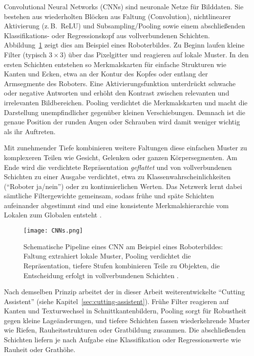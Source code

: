 Convolutional Neural Networks (CNNs) sind neuronale Netze für Bilddaten. Sie bestehen aus wiederholten Blöcken aus Faltung (Convolution), nichtlinearer Aktivierung (z.\,B.\ ReLU) und Subsampling/Pooling sowie einem abschließenden Klassifikations- oder Regressionskopf aus vollverbundenen Schichten. Abbildung~\ref{fig:cnn-schema} zeigt dies am Beispiel eines Roboterbildes. Zu Beginn laufen kleine Filter (typisch $3{\times}3$) über das Pixelgitter und reagieren auf lokale Muster. In den ersten Schichten entstehen so Merkmalskarten für einfache Strukturen wie Kanten und Ecken, etwa an der Kontur des Kopfes oder entlang der Armsegmente des Roboters. Eine Aktivierungsfunktion unterdrückt schwache oder negative Antworten und erhöht den Kontrast zwischen relevanten und irrelevanten Bildbereichen. Pooling verdichtet die Merkmalskarten und macht die Darstellung unempfindlicher gegenüber kleinen Verschiebungen. Demnach ist die genaue Position der runden Augen oder Schrauben wird damit weniger wichtig als ihr Auftreten.

Mit zunehmender Tiefe kombinieren weitere Faltungen diese einfachen Muster zu komplexeren Teilen wie Gesicht, Gelenken oder ganzen Körpersegmenten. Am Ende wird die verdichtete Repräsentation \emph{geflattet} und von vollverbundenen Schichten zu einer Ausgabe verdichtet, etwa zu Klassenwahrscheinlichkeiten (\enquote{Roboter ja/nein}) oder zu kontinuierlichen Werten. Das Netzwerk lernt dabei sämtliche Filtergewichte gemeinsam, sodass frühe und späte Schichten aufeinander abgestimmt sind und eine konsistente Merkmals­hierarchie vom Lokalen zum Globalen entsteht \parencite{FischerPochwyt_NeuronaleNetze_2017}.

\begin{figure}[htbp]
  \centering
  \texttt{[image: CNNs.png]}
  \caption[Schematischer Aufbau eines CNN]{Schematische Pipeline eines CNN am Beispiel eines Roboterbildes: Faltung extrahiert lokale Muster, Pooling verdichtet die Repräsentation, tiefere Stufen kombinieren Teile zu Objekten, die Entscheidung erfolgt in vollverbundenen Schichten \parencite{FischerPochwyt_NeuronaleNetze_2017}.}
  \label{fig:cnn-schema}
\end{figure}

Nach demselben Prinzip arbeitet der in dieser Arbeit weiterentwickelte \enquote{Cutting Assistent} (siehe Kapitel~\ref{sec:cutting-assistent}). Frühe Filter reagieren auf Kanten und Texturwechsel in Schnittkantenbildern, Pooling sorgt für Robustheit gegen kleine Lageänderungen, und tiefere Schichten fassen wiederkehrende Muster wie Riefen, Rauheitsstrukturen oder Gratbildung zusammen. Die abschließenden Schichten liefern je nach Aufgabe eine Klassifikation oder Regressionswerte wie Rauheit oder Grathöhe.
